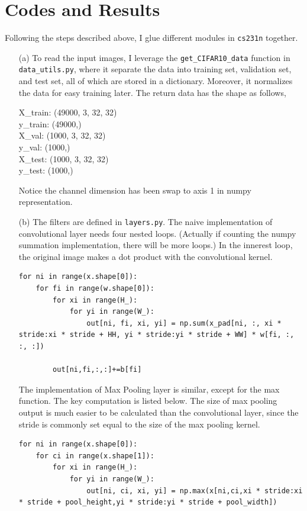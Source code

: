 \documentclass[a4paper, 11pt]{article}
\begin{document}
\section{Codes and Results}
Following the steps described above, I glue different modules in \verb'cs231n' together.
\begin{enumerate}
	\item [(a)] To read the input images, I leverage the \verb'get_CIFAR10_data' function in \verb'data_utils.py', where it separate the data into training set, validation set, and test set, all of which are stored in a dictionary.
	Moreover, it normalizes the data for easy training later.
	The return data has the shape as follows,
\begin{flushleft}
X\_train:  (49000, 3, 32, 32)\\
y\_train:  (49000,)\\
X\_val:  (1000, 3, 32, 32)\\
y\_val:  (1000,)\\
X\_test:  (1000, 3, 32, 32)\\
y\_test:  (1000,)
\end{flushleft}
	Notice the channel dimension has been swap to axis 1 in numpy representation.

	\item [(b)] The filters are defined in \verb'layers.py'.
	The naive implementation of convolutional layer needs four nested loops.
	(Actually if counting the numpy summation implementation, there will be more loops.)
	In the innerest loop, the original image makes a dot product with the convolutional kernel.
\begin{lstlisting}
for ni in range(x.shape[0]):
    for fi in range(w.shape[0]):
        for xi in range(H_):
            for yi in range(W_):
                out[ni, fi, xi, yi] = np.sum(x_pad[ni, :, xi * stride:xi * stride + HH, yi * stride:yi * stride + WW] * w[fi, :, :, :])

        out[ni,fi,:,:]+=b[fi]
\end{lstlisting}

	The implementation of Max Pooling layer is similar, except for the max function.
	The key computation is listed below.
	The size of max pooling output is much easier to be calculated than the convolutional layer, since the stride is commonly set equal to the size of the max pooling kernel.
\begin{lstlisting}
for ni in range(x.shape[0]):
    for ci in range(x.shape[1]):
        for xi in range(H_):
            for yi in range(W_):
                out[ni, ci, xi, yi] = np.max(x[ni,ci,xi * stride:xi * stride + pool_height,yi * stride:yi * stride + pool_width])
\end{lstlisting}


\end{enumerate}
\end{document}
